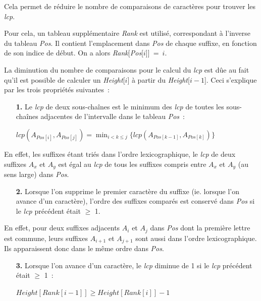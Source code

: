 \documentclass[a4paper,11pt]{article}
\begin{document}
Cela permet de réduire le nombre de comparaisons de caractères pour
trouver les \textit{lcp}.

Pour cela, un tableau supplémentaire \textit{Rank} est utilisé,
correspondant à l'inverse du tableau \textit{Pos}. Il contient
l'emplacement dans \textit{Pos} de chaque suffixe, en fonction de son
indice de début. On a alors \linebreak
\textit{Rank}[\textit{Pos}[$i$]]~=~$i$.

La diminution du nombre de comparaisons pour le calcul du \textit{lcp}
est dûe au fait qu'il est possible de calculer un \textit{Height}[$i$]
à partir du \textit{Height}[$i-1$]. Ceci s'explique par les trois
propriétés suivantes~:

\begin{enumerate}
\item[\textbf{1.}] Le \textit{lcp} de deux sous-chaînes est le minimum des
  \textit{lcp} de toutes les sous-chaînes adjacentes de l'intervalle
  dans le tableau \textit{Pos}~:
  \begin{center}
    $\mathit{lcp}(A_{\mathit{Pos}[i]}, A_{\mathit{Pos}[j]}) =
    \displaystyle\min_{i < k \leq j}
    \{\mathit{lcp}(A_{\mathit{Pos}[k-1]}, A_{\mathit{Pos}[k]})\}$
  \end{center}
\end{enumerate}

En effet, les suffixes étant triés dans l'ordre lexicographique, le
\textit{lcp} de deux suffixes $A_x$ et $A_y$ est égal au \textit{lcp}
de tous les suffixes compris entre $A_x$ et $A_y$ (au sens large) dans
\textit{Pos}.

\begin{enumerate}
\item[\textbf{2.}] Lorsque l'on supprime le premier caractère du suffixe
  (ie. lorsque l'on avance d'un caractère), l'ordre des suffixes
  comparés est conservé dans \textit{Pos} si le \textit{lcp} précédent
  était $\geq$ 1.
\end{enumerate}

En effet, pour deux suffixes adjacents $A_i$ et $A_j$ dans \textit{Pos} dont la
première lettre est commune, leurs suffixes $A_{i+1}$ et $A_{j+1}$
sont aussi dans l'ordre lexicographique. Ils apparaissent donc dans le
même ordre dans \textit{Pos}.

\begin{enumerate}
\item[\textbf{3.}] Lorsque l'on avance d'un caractère, le \textit{lcp}
  diminue de 1 si le \textit{lcp} précédent était $\geq$ 1~:
  \begin{center}
    $\mathit{Height}[\mathit{Rank}[i-1]] \geq
    \mathit{Height}[\mathit{Rank}[i]] - 1$
  \end{center}
\end{enumerate}
\end{document}
